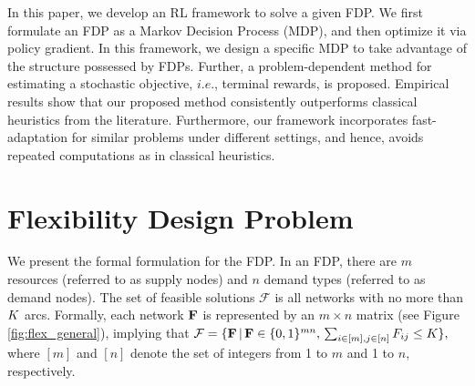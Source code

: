 \documentclass{article} %
\newcommand{\yehua}[1]{{\color{blue}{\bf\sf #1}}}
\begin{document}
In this paper, we develop an RL framework to solve a given FDP. We first formulate an FDP as a Markov Decision Process (MDP), and then optimize it via policy gradient. In this framework, we design a specific MDP to take advantage of the structure possessed by FDPs. Further, a problem-dependent method for estimating a stochastic objective, $i.e.$, terminal rewards, is proposed. 
Empirical results show that our proposed method consistently outperforms classical heuristics from the literature. Furthermore, our framework incorporates fast-adaptation for similar problems under different settings, and hence, avoids repeated computations as in classical heuristics.








\section{Flexibility Design Problem} %

We present the formal formulation for the FDP. In an FDP, there are $m$ resources (referred to as supply nodes) and $n$ demand types (referred to as demand nodes). The set of feasible solutions $\mathcal{F}$ is all networks with no more than $K$ arcs. Formally, each network $\mathbf{F}$ is represented by an $m\times n$ matrix (see Figure \ref{fig:flex_general}), implying that
$\mathcal{F} = \{\mathbf{F} \,|\, \mathbf{F} \in \{0,1\}^{m n},\, \sum_{i\in[m],j\in[n]}F_{ij} \leq K\},$
where $[m]$ and $[n]$ denote the set of integers from 1 to $m$ and 1 to $n$, respectively. 

\end{document}
